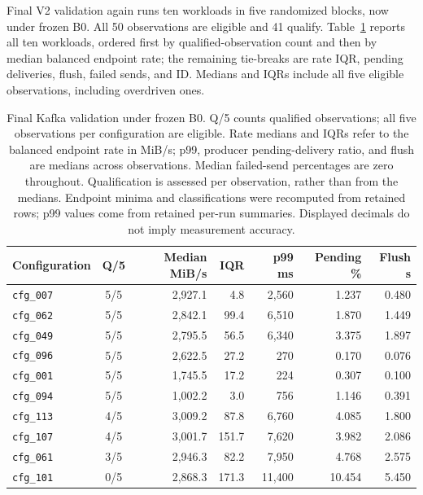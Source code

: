 \documentclass[10pt]{article}
\begin{document}
Final V2 validation again runs ten workloads in five randomized blocks,
now under frozen B0. All 50 observations are eligible and 41 qualify.
Table~\ref{tab:kafka-final} reports all ten workloads, ordered first by
qualified-observation count and then by median balanced endpoint rate; the remaining tie-breaks
are rate IQR, pending deliveries, flush, failed sends, and ID.
Medians and IQRs include all five eligible observations, including overdriven ones.

\begin{table}[H]
\centering
\small
\setlength{\tabcolsep}{5pt}
\begin{tabular}{@{}l c r r r r r@{}}
\toprule
Configuration & Q/5 & Median MiB/s & IQR & p99 ms & Pending \% & Flush s \\
\midrule
\texttt{cfg\_007} & 5/5 & 2,927.1 & 4.8 & 2,560 & 1.237 & 0.480 \\
\texttt{cfg\_062} & 5/5 & 2,842.1 & 99.4 & 6,510 & 1.870 & 1.449 \\
\texttt{cfg\_049} & 5/5 & 2,795.5 & 56.5 & 6,340 & 3.375 & 1.897 \\
\texttt{cfg\_096} & 5/5 & 2,622.5 & 27.2 & 270 & 0.170 & 0.076 \\
\texttt{cfg\_001} & 5/5 & 1,745.5 & 17.2 & 224 & 0.307 & 0.100 \\
\texttt{cfg\_094} & 5/5 & 1,002.2 & 3.0 & 756 & 1.146 & 0.391 \\
\texttt{cfg\_113} & 4/5 & 3,009.2 & 87.8 & 6,760 & 4.085 & 1.800 \\
\texttt{cfg\_107} & 4/5 & 3,001.7 & 151.7 & 7,620 & 3.982 & 2.086 \\
\texttt{cfg\_061} & 3/5 & 2,946.3 & 82.2 & 7,950 & 4.768 & 2.575 \\
\texttt{cfg\_101} & 0/5 & 2,868.3 & 171.3 & 11,400 & 10.454 & 5.450 \\
\bottomrule
\end{tabular}
\caption{Final Kafka validation under frozen B0. Q/5 counts qualified observations;
all five observations per configuration are eligible. Rate medians and IQRs refer to
the balanced endpoint rate in MiB/s;
p99, producer pending-delivery ratio, and flush are medians across observations. Median
failed-send percentages are zero throughout. Qualification is assessed per
observation, rather than from the medians. Endpoint minima and classifications
were recomputed from retained rows; p99 values come from retained per-run summaries.
Displayed decimals do not imply measurement accuracy.}
\label{tab:kafka-final}
\end{table}
\end{document}
